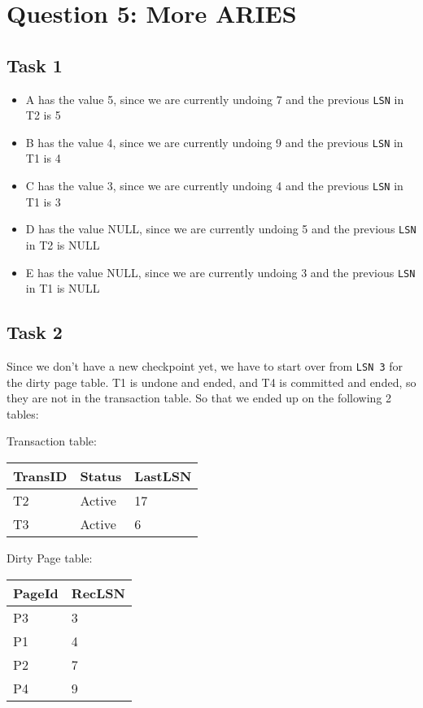 \documentclass[12pt,a4paper]{article}
\begin{document}
\section{Question 5: More ARIES}
\subsection{Task 1}
\begin{itemize}
	\item A has the value 5, since we are currently undoing 7 and the previous \texttt{LSN} in T2 is 5	
	\item B has the value 4, since we are currently undoing 9 and the previous \texttt{LSN} in T1 is 4
	\item C has the value 3, since we are currently undoing 4 and the previous \texttt{LSN} in T1 is 3
	\item D has the value NULL, since we are currently undoing 5 and the previous \texttt{LSN} in T2 is NULL
	\item E has the value NULL, since we are currently undoing 3 and the previous \texttt{LSN} in T1 is NULL
\end{itemize}

\subsection{Task 2}
Since we don't have a new checkpoint yet, we have to start over from \texttt{LSN 3} for the dirty page table.
T1 is undone and ended, and T4 is committed and ended, so they are not in the transaction table.
So that we ended up on the following 2 tables:

Transaction table:
\begin{table}[!htbp]
    \centering
    \begin{tabularx}{\textwidth}{l|l|l}
        \hline
        TransID & Status & LastLSN \\ 
        \hline
        T2 & Active & 17 \\
        T3 & Active &  6 \\         
        \hline
    \end{tabularx}
\end{table}

Dirty Page table:
\begin{table}[!htbp]
    \centering
    \begin{tabularx}{\textwidth}{l|l}
        \hline
        PageId & RecLSN \\ 
        \hline
        P3 & 3 \\
        P1 & 4 \\
        P2 & 7 \\
        P4 & 9 \\         
        \hline
    \end{tabularx}
\end{table}
\end{document}
